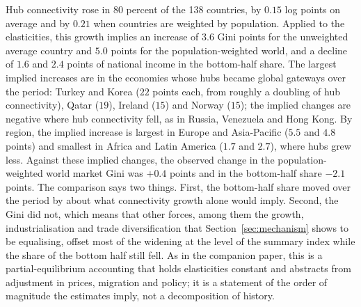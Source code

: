 Hub connectivity rose in 80 percent of the 138 countries, by $0.15$ log points on average and by $0.21$ when countries are weighted by population. Applied to the elasticities, this growth implies an increase of $3.6$ Gini points for the unweighted average country and $5.0$ points for the population-weighted world, and a decline of $1.6$ and $2.4$ points of national income in the bottom-half share. The largest implied increases are in the economies whose hubs became global gateways over the period: Turkey and Korea ($22$ points each, from roughly a doubling of hub connectivity), Qatar ($19$), Ireland ($15$) and Norway ($15$); the implied changes are negative where hub connectivity fell, as in Russia, Venezuela and Hong Kong. By region, the implied increase is largest in Europe and Asia-Pacific ($5.5$ and $4.8$ points) and smallest in Africa and Latin America ($1.7$ and $2.7$), where hubs grew less. Against these implied changes, the observed change in the population-weighted world market Gini was $+0.4$ points and in the bottom-half share $-2.1$ points. The comparison says two things. First, the bottom-half share moved over the period by about what connectivity growth alone would imply. Second, the Gini did not, which means that other forces, among them the growth, industrialisation and trade diversification that Section~\ref{sec:mechanism} shows to be equalising, offset most of the widening at the level of the summary index while the share of the bottom half still fell. As in the companion paper, this is a partial-equilibrium accounting that holds elasticities constant and abstracts from adjustment in prices, migration and policy; it is a statement of the order of magnitude the estimates imply, not a decomposition of history.

